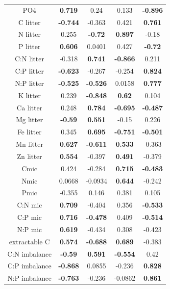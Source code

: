 \documentclass[authoryear,preprint,review,12pt]{elsarticle}
\begin{document}
\begin{table}[h!]
\begin{center}
{\begin{tabular}{ccccc}
  PO4 & \textbf{ 0.719 } & 0.24 & 0.133 & \textbf{ -0.896 } \\ 
  C litter & \textbf{ -0.744 } & -0.363 & 0.421 & \textbf{ 0.761 } \\ 
  N litter & 0.255 & \textbf{ -0.72 } & \textbf{ 0.897 } & -0.18 \\ 
  P litter & \textbf{ 0.606 } & 0.0401 & 0.427 & \textbf{ -0.72 } \\ 
  C:N litter & -0.318 & \textbf{ 0.741 } & \textbf{ -0.866 } & 0.211 \\ 
  C:P litter & \textbf{ -0.623 } & -0.267 & -0.254 & \textbf{ 0.824 } \\ 
  N:P litter & \textbf{ -0.525 } & \textbf{ -0.526 } & 0.0158 & \textbf{ 0.777 } \\ 
  K litter & 0.239 & \textbf{ -0.848 } & \textbf{ 0.62 } & 0.104 \\ 
  Ca litter & 0.248 & \textbf{ 0.784 } & \textbf{ -0.695 } & \textbf{ -0.487 } \\ 
  Mg litter & \textbf{ -0.59 } & \textbf{ 0.551 } & -0.15 & 0.226 \\ 
  Fe litter & 0.345 & \textbf{ 0.695 } & \textbf{ -0.751 } & \textbf{ -0.501 } \\ 
  Mn litter & \textbf{ 0.627 } & \textbf{ -0.611 } & \textbf{ 0.533 } & -0.363 \\ 
  Zn litter & \textbf{ 0.554 } & -0.397 & \textbf{ 0.491 } & -0.379 \\ 
  Cmic & 0.424 & -0.284 & \textbf{ 0.715 } & \textbf{ -0.483 } \\ 
  Nmic & 0.0668 & -0.0934 & \textbf{ 0.644 } & -0.242 \\ 
  Pmic & -0.355 & 0.146 & 0.381 & 0.105 \\ 
  C:N mic & \textbf{ 0.709 } & -0.404 & 0.356 & \textbf{ -0.533 } \\ 
  C:P mic & \textbf{ 0.716 } & \textbf{ -0.478 } & 0.409 & \textbf{ -0.514 } \\ 
  N:P mic & \textbf{ 0.619 } & -0.434 & 0.308 & -0.423 \\ 
  extractable C & \textbf{ 0.574 } & \textbf{ -0.688 } & \textbf{ 0.689 } & -0.383 \\ 
  C:N imbalance & \textbf{ -0.59 } & \textbf{ 0.591 } & \textbf{ -0.554 } & 0.42 \\ 
  C:P imbalance & \textbf{ -0.868 } & 0.0855 & -0.236 & \textbf{ 0.828 } \\ 
  N:P imbalance & \textbf{ -0.763 } & -0.236 & -0.0862 & \textbf{ 0.861 } \\ 
   \hline
\end{tabular}
}
\end{center}
\end{table}
\end{document}
